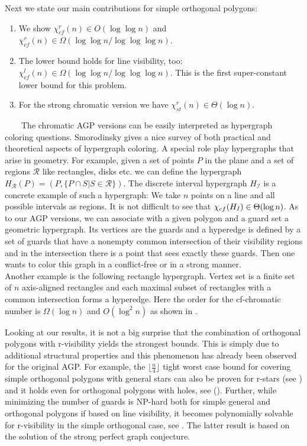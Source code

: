 \documentclass[a4paper,USenglish,numberwithinsect]{lipics}
\theoremstyle{plain}
\begin{document}
Next we state our main  contributions for simple orthogonal polygons:\vspace*{0.2cm}
\begin{enumerate}
\item We show   $\chi^r_{cf}(n)\in O(\log\log n)$ and 
$\chi^r_{cf}(n)\in \Omega(\log\log n /\log\log\log n)$.
\item The lower bound holds for line visibility, too: $\chi^l_{cf}(n)\in
\Omega(\log\log n /\log\log\log n)$. This is the first super-constant
lower bound for this problem.
\item  For the strong chromatic version  we have $\chi^r_{st}(n)\in
\Theta(\log n)$.
\end{enumerate}
\vspace*{0.2cm}
\ \ \ \ The chromatic AGP versions  can be easily interpreted as  hypergraph coloring 
questions. Smorodinsky \cite{Smo} gives a nice survey of both
practical and theoretical aspects of hypergraph coloring.
A special role play hypergraphs that arise in geometry. For example,
given a set of points $P$ in the plane and a set of regions $\mathcal R$
like rectangles, disks etc. we can define the hypergraph $H_{\mathcal
R}(P)= (P, \{P\cap S|S\in{\mathcal R}\})$. The discrete interval
hypergraph $H_{\mathcal I}$  is a concrete example of such a hypergraph:
We take $n$ points on a line and all possible intervals as regions. It
is not difficult to see that $\chi_{cf}(H_{\it I}) \in\Theta (\log n)$.
As to our AGP versions, we can associate with a given polygon and a guard set a geometric hypergraph.
Its vertices are the guards and a hyperedge is defined by a set of guards that have a nonempty common intersection of their visibility regions and in the intersection there is
a point that sees exactly these guards.  Then one wants to color this graph in a conflict-free or in a strong manner. \\
Another  example is the following  rectangle hypergraph.
Vertex set is a finite set of $n$ axis-aligned rectangles and each
maximal subset of rectangles with a common intersection forms a
hyperedge. Here
the order for the cf-chromatic number is $\Omega(\log n)$ and
$O(\log^2n)$ as shown in \cite{Smo,PaTo}.

Looking at our results,  it is  not a big surprise that the 
combination of orthogonal polygons with r-visibility yields the
strongest bounds. This is simply due to additional structural properties and this  phenomenon has already been observed for the original AGP. For example, the $\lfloor\frac{n}{4}\rfloor$ tight
worst case bound for covering simple orthogonal polygons with general
stars can also be proven for r-stars (see \cite{ORourke}) and it
holds even for orthogonal polygons with holes, see (\cite{Hoff}).
Further, while minimizing the number of guards is NP-hard both for
simple general and orthogonal polygons if based on line visibility, it
becomes polynomially solvable for r-visibility in the simple orthogonal
case, see \cite{MRS,Wor}. The latter result is based on the solution of
the strong perfect graph conjecture.
\end{document}
